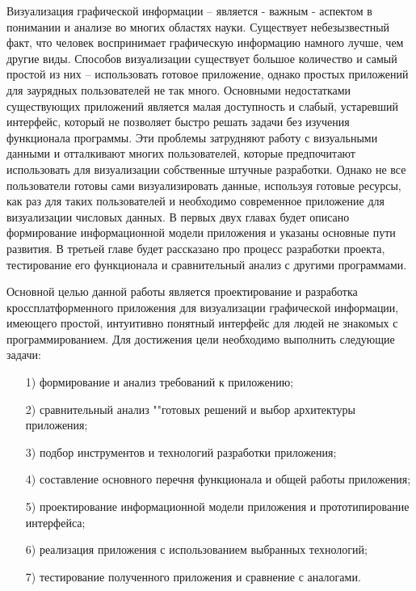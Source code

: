 \intro
Визуализация графической информации -- является - важным - аспектом в понимании и анализе во многих областях науки. Существует небезызвестный факт, что человек воспринимает графическую информацию намного лучше, чем другие виды. Способов визуализации существует большое количество и самый простой из них -- использовать готовое приложение, однако простых приложений для заурядных пользователей не так много. Основными недостатками существующих приложений является малая доступность и слабый, устаревший интерфейс, который не позволяет быстро решать задачи без изучения функционала программы. Эти проблемы затрудняют работу с визуальными данными и отталкивают многих пользователей, которые предпочитают использовать для визуализации собственные штучные разработки. Однако не все пользователи готовы сами визуализировать данные, используя готовые ресурсы, как раз для таких пользователей и необходимо современное приложение для визуализации числовых данных. В первых двух главах будет описано формирование информационной модели приложения и указаны основные пути развития. В третьей главе будет рассказано про процесс разработки проекта, тестирование его функционала и сравнительный анализ с другими программами.

Основной целью данной работы является проектирование и разработка кроссплатформенного приложения для визуализации графической информации, имеющего простой, интуитивно понятный интерфейс для людей не знакомых с программированием.
Для достижения цели необходимо выполнить следующие задачи:
\begin{enumerate}
    \item [1)] формирование и анализ требований к приложению;
    \item [2)] сравнительный анализ ""готовых решений и выбор архитектуры приложения;
    \item [3)] подбор инструментов и технологий разработки приложения;
    \item [4)] составление основного перечня функционала и общей работы приложения;
    \item [5)] проектирование информационной модели приложения и прототипирование интерфейса;
    \item [6)] реализация приложения с использованием выбранных технологий;
    \item [7)] тестирование полученного приложения и сравнение с аналогами.
\end{enumerate}



